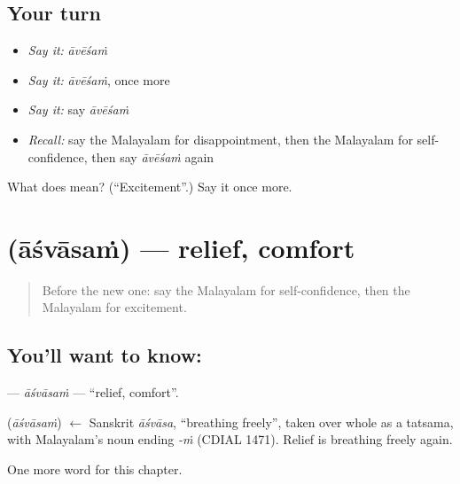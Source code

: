 \subsection*{Your turn}
\begin{itemize}
\raggedright
  \item \emph{Say it:} \emph{āvēśaṁ}
  \item \emph{Say it:} \emph{āvēśaṁ}, once more
  \item \emph{Say it:} say \emph{āvēśaṁ}
  \item \emph{Recall:} say the Malayalam for disappointment, then the Malayalam for self-confidence, then say \emph{āvēśaṁ} again
\end{itemize}

\begin{tcolorbox}[breakable,colback=teal!4,colframe=teal!35!black,title={Before you move on}]
What does  mean? (\textquotedblleft{}Excitement\textquotedblright{}.) Say it once more.
\end{tcolorbox}
\section[\texorpdfstring{\ml{ആശ്വാസം} (āśvāsaṁ)}{ആശ്വാസം (āśvāsaṁ)}]{ (āśvāsaṁ) — relief, comfort}

\label{lesson:ML-C234-asvasam}



\begin{quote}
Before the new one: say the Malayalam for self-confidence, then the Malayalam for excitement.
\end{quote}

\subsection*{You'll want to know: }
\textbf{} — \emph{āśvāsaṁ} — \textquotedblleft{}relief, comfort\textquotedblright{}.

\begin{cousinweb}
\textbf{} (\emph{āśvāsaṁ}) $\leftarrow$ Sanskrit \emph{āśvāsa}, \textquotedblleft{}breathing freely\textquotedblright{}, taken over whole as a tatsama, with Malayalam's noun ending \emph{-ṁ} (CDIAL 1471). Relief is breathing freely again.
\end{cousinweb}

\begin{grammarlens}[title={What you've built}]
One more word for this chapter.
\end{grammarlens}

